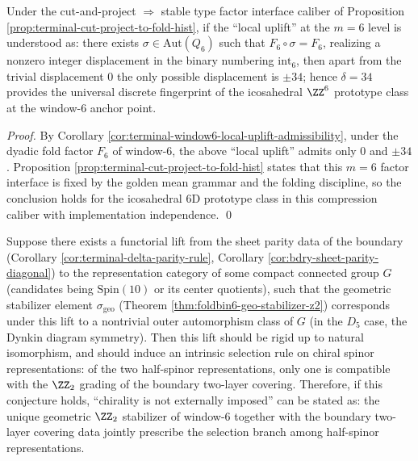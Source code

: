 \begin{corollary}[Universality of Local Uplift on the Icosahedral 6D Prototype: Only \texorpdfstring{$\delta=34$}{delta=34}]\label{cor:bdry-delta34-universal-icosahedral-local-uplift}
Under the cut-and-project \(\Rightarrow\) stable type factor interface caliber of Proposition \ref{prop:terminal-cut-project-to-fold-hist},
if the ``local uplift'' at the \(m=6\) level is understood as: there exists \(\sigma\in\mathrm{Aut}(Q_6)\) such that \(F_6\circ\sigma=F_6\), realizing a nonzero integer displacement in the binary numbering \(\mathrm{int}_6\),
then apart from the trivial displacement \(0\) the only possible displacement is \(\pm 34\);
hence \(\delta=34\) provides the universal discrete fingerprint of the icosahedral \(\ZZ^6\) prototype class at the window-\(6\) anchor point.
\end{corollary}
\begin{proof}
By Corollary \ref{cor:terminal-window6-local-uplift-admissibility}, under the dyadic fold factor \(F_6\) of window-\(6\), the above ``local uplift'' admits only \(0\) and \(\pm 34\).
Proposition \ref{prop:terminal-cut-project-to-fold-hist} states that this \(m=6\) factor interface is fixed by the golden mean grammar and the folding discipline, so the conclusion holds for the icosahedral 6D prototype class in this compression caliber with implementation independence. \qed
\end{proof}

\begin{conjecture}\label{conj:bdry-geo-z2-chiral-selection}
Suppose there exists a functorial lift from the sheet parity data of the boundary (Corollary \ref{cor:terminal-delta-parity-rule}, Corollary \ref{cor:bdry-sheet-parity-diagonal}) to the representation category of some compact connected group \(G\) (candidates being \(\mathrm{Spin}(10)\) or its center quotients), such that the geometric stabilizer element \(\sigma_{\mathrm{geo}}\) (Theorem \ref{thm:foldbin6-geo-stabilizer-z2}) corresponds under this lift to a nontrivial outer automorphism class of \(G\) (in the \(D_5\) case, the Dynkin diagram symmetry).
Then this lift should be rigid up to natural isomorphism, and should induce an intrinsic selection rule on chiral spinor representations: of the two half-spinor representations, only one is compatible with the \(\ZZ_2\) grading of the boundary two-layer covering.
Therefore, if this conjecture holds, ``chirality is not externally imposed'' can be stated as: the unique geometric \(\ZZ_2\) stabilizer of window-\(6\) together with the boundary two-layer covering data jointly prescribe the selection branch among half-spinor representations.
\end{conjecture}

